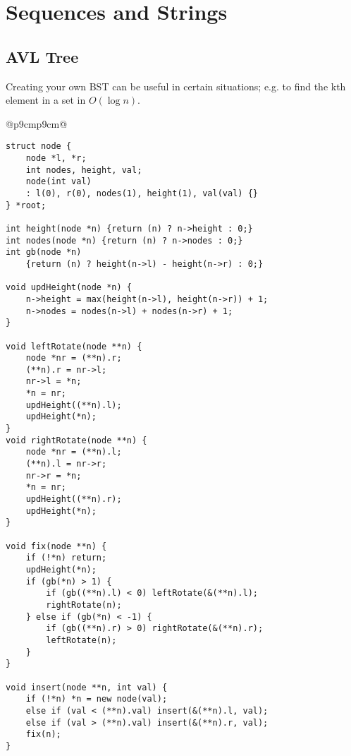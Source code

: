 \documentclass[letterpaper]{article}
\begin{document}
\section{Sequences and Strings}

\subsection {AVL Tree}

Creating your own BST can be useful in certain situations; e.g. to find the kth element in a set in $O\left(\log n\right)$.

\begin{tabular}{@{}p{9cm}p{9cm}@{}}
\begin{lstlisting}
struct node {
	node *l, *r;
	int nodes, height, val;
	node(int val)
	: l(0), r(0), nodes(1), height(1), val(val) {}
} *root;

int height(node *n) {return (n) ? n->height : 0;}
int nodes(node *n) {return (n) ? n->nodes : 0;}
int gb(node *n)
	{return (n) ? height(n->l) - height(n->r) : 0;}

void updHeight(node *n) {
	n->height = max(height(n->l), height(n->r)) + 1;
	n->nodes = nodes(n->l) + nodes(n->r) + 1;
}

void leftRotate(node **n) {
	node *nr = (**n).r;
	(**n).r = nr->l;
	nr->l = *n;
	*n = nr;
	updHeight((**n).l);
	updHeight(*n);
}
void rightRotate(node **n) {
	node *nr = (**n).l;
	(**n).l = nr->r;
	nr->r = *n;
	*n = nr;
	updHeight((**n).r);
	updHeight(*n);
}

void fix(node **n) {
	if (!*n) return;
	updHeight(*n);
	if (gb(*n) > 1) {
		if (gb((**n).l) < 0) leftRotate(&(**n).l);
		rightRotate(n);
	} else if (gb(*n) < -1) {
		if (gb((**n).r) > 0) rightRotate(&(**n).r);
		leftRotate(n);
	}
}

void insert(node **n, int val) {
	if (!*n) *n = new node(val);
	else if (val < (**n).val) insert(&(**n).l, val);
	else if (val > (**n).val) insert(&(**n).r, val);
	fix(n);
}


\end{lstlisting}
\end{tabular}
\end{document}

